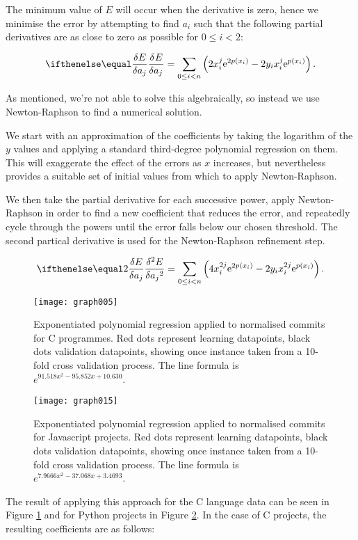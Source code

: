 \documentclass[10pt,journal,compsoc]{IEEEtran}
\begin{document}
The minimum value of $E$ will occur when the derivative is zero, hence we minimise the error by attempting to find $a_i$ such that the following partial derivatives are as close to zero as possible for $0 \le i < 2$:

$$
\partdiff{E}{a_j} = \sum_{0 \le i < n} \left( 2 x_i^j \e{2 p(x_i)} - 2 y_i x_i^j \e{p(x_i)} \right) .
$$

As mentioned, we're not able to solve this algebraically, so instead we use Newton-Raphson to find a numerical solution.


We start with an approximation of the coefficients by taking the logarithm of the $y$ values and applying a standard third-degree polynomial regression on them. This will exaggerate the effect of the errors as $x$ increases, but nevertheless provides a suitable set of initial values from which to apply Newton-Raphson.

We then take the partial derivative for each successive power, apply Newton-Raphson in order to find a new coefficient that reduces the error, and repeatedly cycle through the powers until the error falls below our chosen threshold. The second partical derivative is used for the Newton-Raphson refinement step.

$$
\partdiff[2]{E}{a_j} = \sum_{0 \le i < n} \left( 4 x_i^{2j} \e{2 p(x_i)} - 2 y_i x_i^{2j} \e{p(x_i)} \right) .
$$

\begin{figure}[t]
\centering
\texttt{[image: graph005]}%
\caption{\label{fig:c-exp}Exponentiated polynomial regression applied to normalised commits for C programmes. Red dots represent learning datapoints, black dots validation datapoints, showing once instance taken from a 10-fold cross validation process. The line formula is $e^{91.518 x^{2} - 95.852 x + 10.630}$.}
\end{figure}

\begin{figure}[t]
\centering
\texttt{[image: graph015]}%
\caption{\label{fig:javascript-exp}Exponentiated polynomial regression applied to normalised commits for Javascript projects. Red dots represent learning datapoints, black dots validation datapoints, showing once instance taken from a 10-fold cross validation process. The line formula is $e^{7.9666 x^{2} - 37.068 x + 3.4693}$.}
\end{figure}

The result of applying this approach for the C language data can be seen in Figure \ref{fig:c-exp} and for Python projects in Figure \ref{fig:javascript-exp}. In the case of C projects, the resulting coefficients are as follows:
\end{document}

